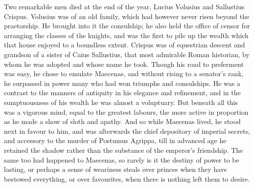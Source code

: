 
Two remarkable men died at the end of the year, Lucius Volusius and Sallustius Crispus. Volusius was of an old family, which had however never risen beyond the praetorship. He brought into it the consulship; he also held the office of censor for arranging the classes of the knights, and was the first to pile up the wealth which that house enjoyed to a boundless extent. Crispus was of equestrian descent and grandson of a sister of Caius Sallustius, that most admirable Roman historian, by whom he was adopted and whose name he took. Though his road to preferment was easy, he chose to emulate Maecenas, and without rising to a senator's rank, he surpassed in power many who had won triumphs and consulships. He was a contrast to the manners of antiquity in his elegance and refinement, and in the sumptuousness of his wealth he was almost a voluptuary. But beneath all this was a vigorous mind, equal to the greatest labours, the more active in proportion as he made a show of sloth and apathy. And so while Maecenas lived, he stood next in favour to him, and was afterwards the chief depository of imperial secrets, and accessory to the murder of Postumus Agrippa, till in advanced age he retained the shadow rather than the substance of the emperor's friendship. The same too had happened to Maecenas, so rarely is it the destiny of power to be lasting, or perhaps a sense of weariness steals over princes when they have bestowed everything, or over favourites, when there is nothing left them to desire.


